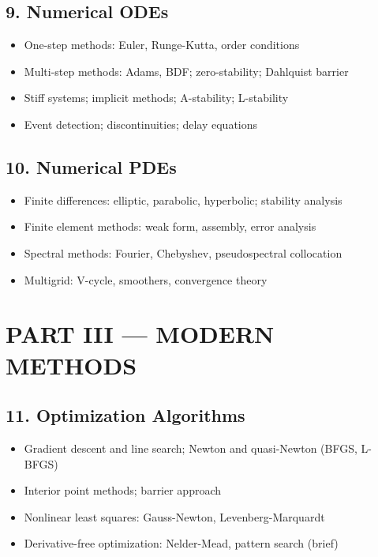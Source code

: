 \subsection{9. Numerical ODEs}
\begin{itemize}
\item One-step methods: Euler, Runge-Kutta, order conditions
\item Multi-step methods: Adams, BDF; zero-stability; Dahlquist barrier
\item Stiff systems; implicit methods; A-stability; L-stability
\item Event detection; discontinuities; delay equations
\end{itemize}

\subsection{10. Numerical PDEs}
\begin{itemize}
\item Finite differences: elliptic, parabolic, hyperbolic; stability analysis
\item Finite element methods: weak form, assembly, error analysis
\item Spectral methods: Fourier, Chebyshev, pseudospectral collocation
\item Multigrid: V-cycle, smoothers, convergence theory
\end{itemize}

\section{PART III --- MODERN METHODS}

\subsection{11. Optimization Algorithms}
\begin{itemize}
\item Gradient descent and line search; Newton and quasi-Newton (BFGS, L-BFGS)
\item Interior point methods; barrier approach
\item Nonlinear least squares: Gauss-Newton, Levenberg-Marquardt
\item Derivative-free optimization: Nelder-Mead, pattern search (brief)
\end{itemize}

